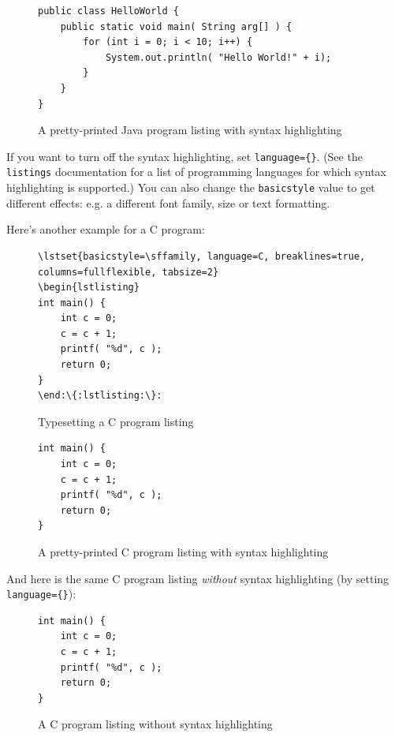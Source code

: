 \begin{figure}[hbt!]
\lstset{basicstyle=\small\ttfamily, language=Java, breaklines=true, columns=fullflexible, framesep=10pt, xleftmargin=16pt, tabsize=2}
\begin{lstlisting}
public class HelloWorld {
	public static void main( String arg[] ) {
        for (int i = 0; i < 10; i++) {
			System.out.println( "Hello World!" + i);
		}
	}
}
\end{lstlisting}
\caption{A pretty-printed Java program listing with syntax highlighting}
\end{figure}


If you want to turn off the syntax highlighting, set \verb|language={}|.  (See the \verb|listings| documentation for a list of programming languages for which syntax highlighting is supported.)  You can also change the \verb|basicstyle| value to get different effects: e.g. a different font family, size or text formatting.

Here's another example for a C program:

\begin{figure}[hbt!]
\begin{lstlisting}[escapechar={:}, texcl=false,language={}]
\lstset{basicstyle=\sffamily, language=C, breaklines=true, columns=fullflexible, tabsize=2}
\begin{lstlisting}
int main() {
	int c = 0;
	c = c + 1;
	printf( "%d", c );
	return 0;
}
\end:\{:lstlisting:\}:
\end{lstlisting}
\caption{Typesetting a C program listing}\label{fig:lst:c}
\end{figure}

\begin{figure}[hbt!]
\lstset{basicstyle=\sffamily, language=C, breaklines=true, columns=fullflexible, framesep=10pt, xleftmargin=.4\textwidth, tabsize=4}
\begin{lstlisting}
int main() {
	int c = 0;
	c = c + 1;
	printf( "%d", c );
	return 0;
}
\end{lstlisting}
\caption{A pretty-printed C program listing with syntax highlighting}
\end{figure}


And here is the same C program listing \emph{without} syntax highlighting (by setting \verb|language={}|):

\begin{figure}[hbt!]

\begin{lstlisting}
int main() {
	int c = 0;
	c = c + 1;
	printf( "%d", c );
	return 0;
}
\end{lstlisting}
\caption{A C program listing without syntax highlighting}
\end{figure}
